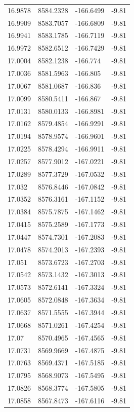 \begin{table}[H]
\begin{tabular}{llll}
16.9878 & 8584.2328 & -166.6499 & -9.81 \\
16.9909 & 8583.7057 & -166.6809 & -9.81 \\
16.9941 & 8583.1785 & -166.7119 & -9.81 \\
16.9972 & 8582.6512 & -166.7429 & -9.81 \\
17.0004 & 8582.1238 & -166.774 & -9.81 \\
17.0036 & 8581.5963 & -166.805 & -9.81 \\
17.0067 & 8581.0687 & -166.836 & -9.81 \\
17.0099 & 8580.5411 & -166.867 & -9.81 \\
17.0131 & 8580.0133 & -166.8981 & -9.81 \\
17.0162 & 8579.4854 & -166.9291 & -9.81 \\
17.0194 & 8578.9574 & -166.9601 & -9.81 \\
17.0225 & 8578.4294 & -166.9911 & -9.81 \\
17.0257 & 8577.9012 & -167.0221 & -9.81 \\
17.0289 & 8577.3729 & -167.0532 & -9.81 \\
17.032 & 8576.8446 & -167.0842 & -9.81 \\
17.0352 & 8576.3161 & -167.1152 & -9.81 \\
17.0384 & 8575.7875 & -167.1462 & -9.81 \\
17.0415 & 8575.2589 & -167.1773 & -9.81 \\
17.0447 & 8574.7301 & -167.2083 & -9.81 \\
17.0478 & 8574.2013 & -167.2393 & -9.81 \\
17.051 & 8573.6723 & -167.2703 & -9.81 \\
17.0542 & 8573.1432 & -167.3013 & -9.81 \\
17.0573 & 8572.6141 & -167.3324 & -9.81 \\
17.0605 & 8572.0848 & -167.3634 & -9.81 \\
17.0637 & 8571.5555 & -167.3944 & -9.81 \\
17.0668 & 8571.0261 & -167.4254 & -9.81 \\
17.07 & 8570.4965 & -167.4565 & -9.81 \\
17.0731 & 8569.9669 & -167.4875 & -9.81 \\
17.0763 & 8569.4371 & -167.5185 & -9.81 \\
17.0795 & 8568.9073 & -167.5495 & -9.81 \\
17.0826 & 8568.3774 & -167.5805 & -9.81 \\
17.0858 & 8567.8473 & -167.6116 & -9.81 \\

\end{tabular}
\end{table}
